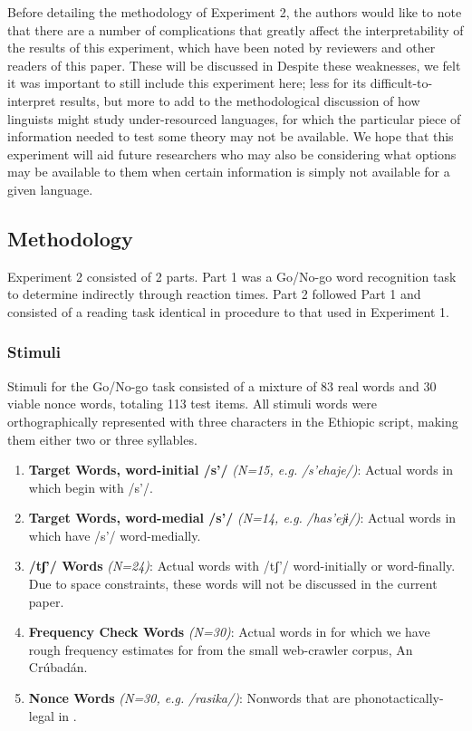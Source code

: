 \documentclass[output=paper
,newtxmath
,modfonts
,nonflat]{langsci/langscibook}
\begin{document}
Before detailing the methodology of Experiment 2, the authors would like to note that there are a number of complications that greatly affect the interpretability of the results of this experiment, which have been noted by reviewers and other readers of this paper. These will be discussed in  Despite these weaknesses, we felt it was important to still include this experiment here; less for its difficult-to-interpret results, but more to add to the methodological discussion of how linguists might study under-resourced languages, for which the particular piece of information needed to test some theory may not be available. We hope that this experiment will aid future researchers who may also be considering what options may be available to them when certain information is simply not available for a given language.

\subsection{Methodology}\label{sec:moeng:6.1}

Experiment 2 consisted of 2 parts. Part 1 was a Go/No-go word recognition task to determine  indirectly through reaction times. Part 2 followed Part 1 and consisted of a reading task identical in procedure to that used in Experiment 1.

\subsubsection{Stimuli}\label{sec:moeng:6.1.1}

Stimuli for the Go/No-go task consisted of a mixture of 83 real  words and 30 viable nonce words, totaling 113 test items. All stimuli words were orthographically represented with three characters in the Ethiopic script, making them either two or three syllables. 

\begin{enumerate}
\item {\textbf{Target Words, word-initial /s’/} \textit{(N=15, e.g.}  \textit{/s’ehaje/)}: Actual words in  which begin with /s’/.}
\item {\textbf{Target Words, word-medial /s’/} \textit{(N=14, e.g.}  \textit{/has’ejɨ}\textit{/)}: Actual words in  which have /s’/ word-medially.}
\item {\textbf{/tʃ’/ Words} \textit{(N=24)}: Actual words with /tʃ’/ word-initially or word-finally. Due to space constraints, these words will not be discussed in the current paper.}
\item {\textbf{Frequency Check Words} \textit{(N=30)}: Actual words in  for which we have rough frequency estimates for from the small web-crawler corpus, An Crúbadán.}
\item {\textbf{Nonce Words} \textit{(N=30, e.g.}  \textit{/rasika/)}: Nonwords that are phonotactically-legal in .} 
\end{enumerate}
\end{document}
